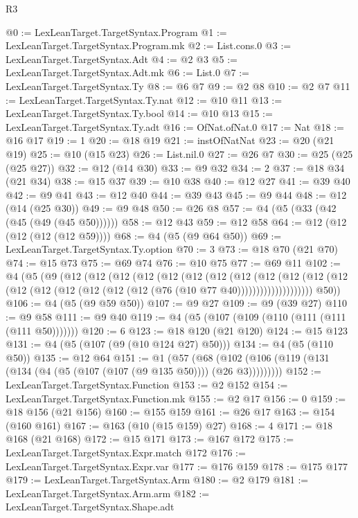 \begin{lexlean}{R3}
\begin{coremodule}
@0 := LexLeanTarget.TargetSyntax.Program
@1 := LexLeanTarget.TargetSyntax.Program.mk
@2 := List.cons.{0}
@3 := LexLeanTarget.TargetSyntax.Adt
@4 := @2 @3
@5 := LexLeanTarget.TargetSyntax.Adt.mk
@6 := List.{0}
@7 := LexLeanTarget.TargetSyntax.Ty
@8 := @6 @7
@9 := @2 @8
@10 := @2 @7
@11 := LexLeanTarget.TargetSyntax.Ty.nat
@12 := @10 @11
@13 := LexLeanTarget.TargetSyntax.Ty.bool
@14 := @10 @13
@15 := LexLeanTarget.TargetSyntax.Ty.adt
@16 := OfNat.ofNat.{0}
@17 := Nat
@18 := @16 @17
@19 := 1
@20 := @18 @19
@21 := instOfNatNat
@23 := @20 (@21 @19)
@25 := @10 (@15 @23)
@26 := List.nil.{0}
@27 := @26 @7
@30 := @25 (@25 (@25 @27))
@32 := @12 (@14 @30)
@33 := @9 @32
@34 := 2
@37 := @18 @34 (@21 @34)
@38 := @15 @37
@39 := @10 @38
@40 := @12 @27
@41 := @39 @40
@42 := @9 @41
@43 := @12 @40
@44 := @39 @43
@45 := @9 @44
@48 := @12 (@14 (@25 @30))
@49 := @9 @48
@50 := @26 @8
@57 := @4 (@5 (@33 (@42 (@45 (@49 (@45 @50))))))
@58 := @12 @43
@59 := @12 @58
@64 := @12 (@12 (@12 (@12 (@12 @59))))
@68 := @4 (@5 (@9 @64 @50))
@69 := LexLeanTarget.TargetSyntax.Ty.option
@70 := 3
@73 := @18 @70 (@21 @70)
@74 := @15 @73
@75 := @69 @74
@76 := @10 @75
@77 := @69 @11
@102 := @4
    (@5
      (@9
        (@12
          (@12
            (@12
              (@12
                (@12
                  (@12
                    (@12
                      (@12
                        (@12
                          (@12
                            (@12
                              (@12
                                (@12 (@12 (@12 (@12 (@12 (@12 (@76 (@10 @77 @40))))))))))))))))))))
        @50))
@106 := @4 (@5 (@9 @59 @50))
@107 := @9 @27
@109 := @9 (@39 @27)
@110 := @9 @58
@111 := @9 @40
@119 := @4 (@5 (@107 (@109 (@110 (@111 (@111 (@111 @50)))))))
@120 := 6
@123 := @18 @120 (@21 @120)
@124 := @15 @123
@131 := @4 (@5 (@107 (@9 (@10 @124 @27) @50)))
@134 := @4 (@5 (@110 @50))
@135 := @12 @64
@151 := @1
    (@57 (@68 (@102 (@106 (@119 (@131 (@134 (@4 (@5 (@107 (@107 (@9 @135 @50)))) (@26 @3)))))))))
@152 := LexLeanTarget.TargetSyntax.Function
@153 := @2 @152
@154 := LexLeanTarget.TargetSyntax.Function.mk
@155 := @2 @17
@156 := 0
@159 := @18 @156 (@21 @156)
@160 := @155 @159
@161 := @26 @17
@163 := @154 (@160 @161)
@167 := @163 (@10 (@15 @159) @27)
@168 := 4
@171 := @18 @168 (@21 @168)
@172 := @15 @171
@173 := @167 @172
@175 := LexLeanTarget.TargetSyntax.Expr.match @172
@176 := LexLeanTarget.TargetSyntax.Expr.var
@177 := @176 @159
@178 := @175 @177
@179 := LexLeanTarget.TargetSyntax.Arm
@180 := @2 @179
@181 := LexLeanTarget.TargetSyntax.Arm.arm
@182 := LexLeanTarget.TargetSyntax.Shape.adt

\end{coremodule}
\end{lexlean}
